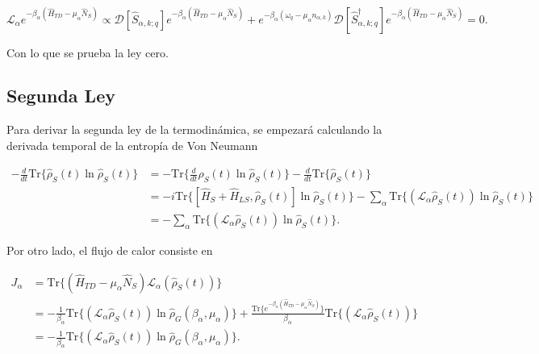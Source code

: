 \begin{appendixs}
\begin{equation*}
    \mathcal{L}_{\alpha}e^{-\beta_{\alpha}(\hat{H}_{TD} - \mu_{\alpha}\hat{N}_{S})} \propto  \mathcal{D}[\hat{S}_{\alpha,k;q}]e^{-\beta_{\alpha}(\hat{H}_{TD} - \mu_{\alpha}\hat{N}_{S})} + e^{-\beta_{\alpha}(\omega_{q} - \mu_{\alpha}n_{\alpha,k})}\mathcal{D}[\hat{S}^{\dagger}_{\alpha,k;q}]e^{-\beta_{\alpha}(\hat{H}_{TD} - \mu_{\alpha}\hat{N}_{S})} = 0.
\end{equation*}

Con lo que se prueba la ley cero.

\newpage


\subsection{Segunda Ley}
Para derivar la segunda ley de la termodinámica, se empezará calculando la derivada temporal de la entropía de Von Neumann

\begin{align*}
    - \frac{d}{dt}\text{Tr}\{ \hat{\rho}_{S}(t)\ln \hat{\rho}_{S}(t) \} & =  -\text{Tr}\Big\{ \frac{d}{dt}\hat{\rho}_{S}(t)\ln \hat{\rho}_{S}(t) \Big\} - \frac{d}{dt}\text{Tr}\{\hat{\rho}_{S}(t) \}\\
  & = - i \text{Tr}\{[\hat{H}_{S}+\hat{H}_{LS},\hat{\rho}_{S}(t)]\ln \hat{\rho}_{S}(t)  \} - \sum_{\alpha} \text{Tr}\{(\mathcal{L}_{\alpha}\hat{\rho}_{S}(t)) \ln \hat{\rho}_{S}(t) \}  \\
  & = -\sum_{\alpha}\text{Tr}\{(\mathcal{L}_{\alpha}\hat{\rho}_{S}(t)) \ln \hat{\rho}_{S}(t) \}.
\end{align*}

Por otro lado, el flujo de calor consiste en 

\begin{align*}
    J_{\alpha} & = \text{Tr}\{ (\hat{H}_{TD} - \mu_{\alpha}\hat{N}_{S})\mathcal{L}_{\alpha}(\hat{\rho}_{S}(t)) \} \\
    & = -\frac{1}{\beta_{\alpha}} \text{Tr}\{(\mathcal{L}_{\alpha}\hat{\rho}_{S}(t)) \ln \hat{\rho}_{G}(\beta_{\alpha},\mu_{\alpha})  \} + \frac{\text{Tr}\{e^{-\beta_{\alpha}(\hat{H}_{TD} - \mu_{\alpha}\hat{N}_{S})} \} }{\beta_{\alpha}} \text{Tr}\{(\mathcal{L}_{\alpha}\hat{\rho}_{S}(t)) \} \\
    & = -\frac{1}{\beta_{\alpha}} \text{Tr}\{(\mathcal{L}_{\alpha}\hat{\rho}_{S}(t))\ln \hat{\rho}_{G}(\beta_{\alpha},\mu_{\alpha})  \}.
\end{align*}


\end{appendixs}
